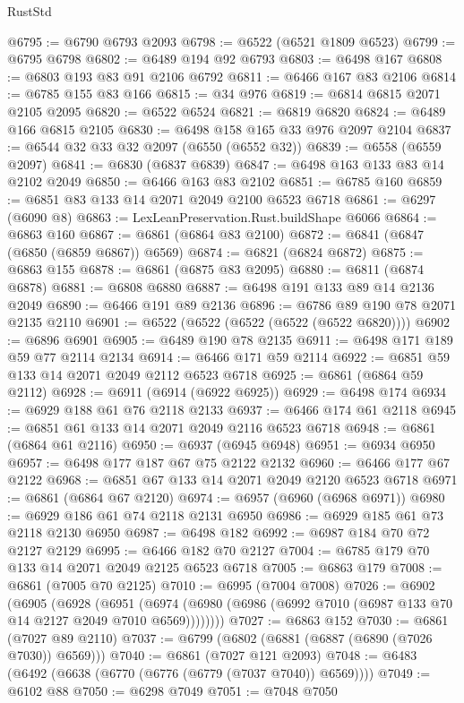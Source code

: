 \begin{lexlean}{RustStd}
\begin{coremodule}
@6795 := @6790 @6793 @2093
@6798 := @6522 (@6521 @1809 @6523)
@6799 := @6795 @6798
@6802 := @6489 @194 @92 @6793
@6803 := @6498 @167
@6808 := @6803 @193 @83 @91 @2106 @6792
@6811 := @6466 @167 @83 @2106
@6814 := @6785 @155 @83 @166
@6815 := @34 @976
@6819 := @6814 @6815 @2071 @2105 @2095
@6820 := @6522 @6524
@6821 := @6819 @6820
@6824 := @6489 @166 @6815 @2105
@6830 := @6498 @158 @165 @33 @976 @2097 @2104
@6837 := @6544 @32 @33 @32 @2097 (@6550 (@6552 @32))
@6839 := @6558 (@6559 @2097)
@6841 := @6830 (@6837 @6839)
@6847 := @6498 @163 @133 @83 @14 @2102 @2049
@6850 := @6466 @163 @83 @2102
@6851 := @6785 @160
@6859 := @6851 @83 @133 @14 @2071 @2049 @2100 @6523 @6718
@6861 := @6297 (@6090 @8)
@6863 := LexLeanPreservation.Rust.buildShape @6066
@6864 := @6863 @160
@6867 := @6861 (@6864 @83 @2100)
@6872 := @6841 (@6847 (@6850 (@6859 @6867)) @6569)
@6874 := @6821 (@6824 @6872)
@6875 := @6863 @155
@6878 := @6861 (@6875 @83 @2095)
@6880 := @6811 (@6874 @6878)
@6881 := @6808 @6880
@6887 := @6498 @191 @133 @89 @14 @2136 @2049
@6890 := @6466 @191 @89 @2136
@6896 := @6786 @89 @190 @78 @2071 @2135 @2110
@6901 := @6522 (@6522 (@6522 (@6522 (@6522 @6820))))
@6902 := @6896 @6901
@6905 := @6489 @190 @78 @2135
@6911 := @6498 @171 @189 @59 @77 @2114 @2134
@6914 := @6466 @171 @59 @2114
@6922 := @6851 @59 @133 @14 @2071 @2049 @2112 @6523 @6718
@6925 := @6861 (@6864 @59 @2112)
@6928 := @6911 (@6914 (@6922 @6925))
@6929 := @6498 @174
@6934 := @6929 @188 @61 @76 @2118 @2133
@6937 := @6466 @174 @61 @2118
@6945 := @6851 @61 @133 @14 @2071 @2049 @2116 @6523 @6718
@6948 := @6861 (@6864 @61 @2116)
@6950 := @6937 (@6945 @6948)
@6951 := @6934 @6950
@6957 := @6498 @177 @187 @67 @75 @2122 @2132
@6960 := @6466 @177 @67 @2122
@6968 := @6851 @67 @133 @14 @2071 @2049 @2120 @6523 @6718
@6971 := @6861 (@6864 @67 @2120)
@6974 := @6957 (@6960 (@6968 @6971))
@6980 := @6929 @186 @61 @74 @2118 @2131 @6950
@6986 := @6929 @185 @61 @73 @2118 @2130 @6950
@6987 := @6498 @182
@6992 := @6987 @184 @70 @72 @2127 @2129
@6995 := @6466 @182 @70 @2127
@7004 := @6785 @179 @70 @133 @14 @2071 @2049 @2125 @6523 @6718
@7005 := @6863 @179
@7008 := @6861 (@7005 @70 @2125)
@7010 := @6995 (@7004 @7008)
@7026 := @6902
    (@6905
      (@6928
        (@6951 (@6974 (@6980 (@6986 (@6992 @7010 (@6987 @133 @70 @14 @2127 @2049 @7010 @6569))))))))
@7027 := @6863 @152
@7030 := @6861 (@7027 @89 @2110)
@7037 := @6799 (@6802 (@6881 (@6887 (@6890 (@7026 @7030)) @6569)))
@7040 := @6861 (@7027 @121 @2093)
@7048 := @6483 (@6492 (@6638 (@6770 (@6776 (@6779 (@7037 @7040)) @6569))))
@7049 := @6102 @88
@7050 := @6298 @7049
@7051 := @7048 @7050

\end{coremodule}
\end{lexlean}
